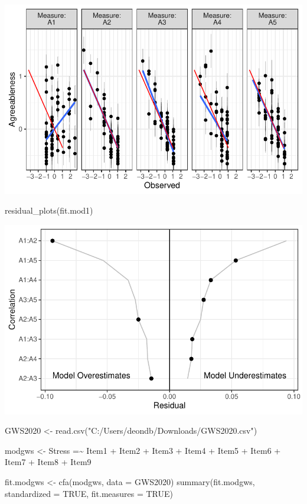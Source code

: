 \documentclass[
  letterpaper,
  DIV=11,
  numbers=noendperiod]{scrreprt}
\newenvironment{Shaded}{\begin{snugshade}}{\end{snugshade}}
\newcommand{\AttributeTok}[1]{\textcolor[rgb]{0.40,0.45,0.13}{#1}}
\newcommand{\ConstantTok}[1]{\textcolor[rgb]{0.56,0.35,0.01}{#1}}
\newcommand{\FunctionTok}[1]{\textcolor[rgb]{0.28,0.35,0.67}{#1}}
\newcommand{\NormalTok}[1]{\textcolor[rgb]{0.00,0.23,0.31}{#1}}
\newcommand{\OtherTok}[1]{\textcolor[rgb]{0.00,0.23,0.31}{#1}}
\newcommand{\StringTok}[1]{\textcolor[rgb]{0.13,0.47,0.30}{#1}}
\begin{document}
\includegraphics{Spearman_files/figure-pdf/unnamed-chunk-1-2.pdf}

\begin{Shaded}
\begin{Highlighting}[]
\FunctionTok{residual\_plots}\NormalTok{(fit.mod1)}
\end{Highlighting}
\end{Shaded}

\includegraphics{Spearman_files/figure-pdf/unnamed-chunk-1-3.pdf}

\begin{Shaded}
\begin{Highlighting}[]
\NormalTok{GWS2020 }\OtherTok{\textless{}{-}} \FunctionTok{read.csv}\NormalTok{(}\StringTok{"C:/Users/deondb/Downloads/GWS2020.csv"}\NormalTok{)}

\NormalTok{modgws }\OtherTok{\textless{}{-}} \StringTok{\textquotesingle{}}
\StringTok{Stress =\textasciitilde{} Item1 + Item2 + Item3 + Item4 + Item5 + Item6 + Item7 + Item8 + Item9}
\StringTok{\textquotesingle{}}

\NormalTok{fit.modgws }\OtherTok{\textless{}{-}} \FunctionTok{cfa}\NormalTok{(modgws, }\AttributeTok{data =}\NormalTok{ GWS2020)}
\FunctionTok{summary}\NormalTok{(fit.modgws, }\AttributeTok{standardized =} \ConstantTok{TRUE}\NormalTok{, }\AttributeTok{fit.measures =} \ConstantTok{TRUE}\NormalTok{)}
\end{Highlighting}
\end{Shaded}
\end{document}
